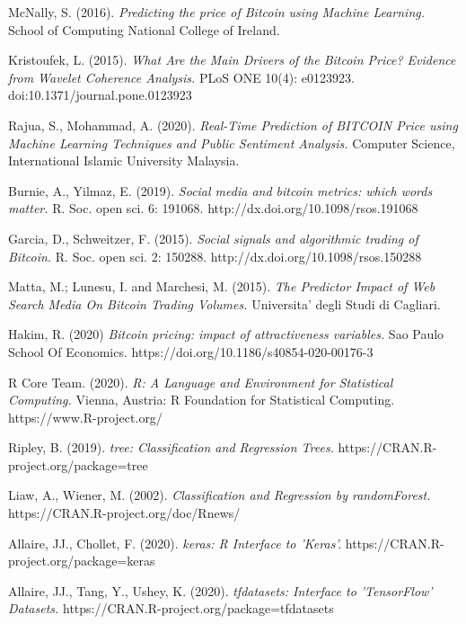 \documentclass[a4paper,12pt,twocolumn]{article}
\begin{document}
\begin{thebibliography}{99}
McNally, S. (2016).
{\em Predicting the price of Bitcoin using Machine Learning.} School of Computing National College of Ireland.

Kristoufek, L. (2015). {\em What Are the Main
Drivers of the Bitcoin Price? Evidence from Wavelet
Coherence Analysis.} PLoS ONE 10(4): e0123923.
doi:10.1371/journal.pone.0123923

Rajua, S., Mohammad, A. (2020).
{\em Real-Time Prediction of BITCOIN Price using Machine Learning Techniques and Public Sentiment Analysis.}
Computer Science, International Islamic University Malaysia.

Burnie, A., Yilmaz, E. (2019). 
{\em Social media and bitcoin metrics: which words matter.}
R. Soc. open sci. 6: 191068.
http://dx.doi.org/10.1098/rsos.191068

Garcia, D., Schweitzer, F. (2015).
{\em Social signals and algorithmic trading of Bitcoin.} R. Soc. open sci. 2: 150288.
http://dx.doi.org/10.1098/rsos.150288

Matta, M.; Lunesu, I. and Marchesi, M.  (2015).
{\em The Predictor Impact of Web Search Media On Bitcoin Trading Volumes.}
Universita’ degli Studi di Cagliari.

Hakim, R. (2020)
{\em Bitcoin pricing: impact of attractiveness variables.}
Sao Paulo School Of Economics.
https://doi.org/10.1186/s40854-020-00176-3

R Core Team. (2020). 
{\em R: A Language and Environment for Statistical Computing.}
Vienna, Austria: R Foundation for Statistical Computing. 
https://www.R-project.org/

Ripley, B. (2019). 
{\em tree: Classification and Regression Trees.}
https://CRAN.R-project.org/package=tree

Liaw, A., Wiener, M. (2002). 
{\em Classification and Regression by randomForest.}
https://CRAN.R-project.org/doc/Rnews/

Allaire, JJ., Chollet, F. (2020).
{\em keras: R Interface to 'Keras'.}
https://CRAN.R-project.org/package=keras

Allaire, JJ., Tang, Y., Ushey, K. (2020).
{\em tfdatasets: Interface to 'TensorFlow' Datasets.}
https://CRAN.R-project.org/package=tfdatasets


\end{thebibliography}
\end{document}

